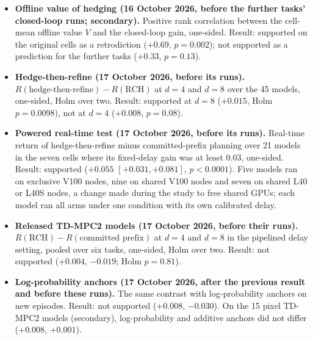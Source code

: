 \begin{itemize}
\item \textbf{Offline value of hedging (16 October 2026, before the further tasks' closed-loop runs; secondary).} Positive rank correlation between the cell-mean offline value $V$ and the closed-loop gain, one-sided. Result: supported on the original cells as a retrodiction ($+0.69$, $p=0.002$); not supported as a prediction for the further tasks ($+0.33$, $p=0.13$).
\item \textbf{Hedge-then-refine (17 October 2026, before its runs).} $R(\text{hedge-then-refine})-R(\text{RCH})$ at $d=4$ and $d=8$ over the 45 models, one-sided, Holm over two. Result: supported at $d=8$ ($+0.015$, Holm $p=0.0098$), not at $d=4$ ($+0.008$, $p=0.08$).
\item \textbf{Powered real-time test (17 October 2026, before its runs).} Real-time return of hedge-then-refine minus committed-prefix planning over 21 models in the seven cells where its fixed-delay gain was at least 0.03, one-sided. Result: supported ($+0.055$ $[+0.031, +0.081]$, $p<0.0001$). Five models ran on exclusive V100 nodes, nine on shared V100 nodes and seven on shared L40 or L40S nodes, a change made during the study to free shared GPUs; each model ran all arms under one condition with its own calibrated delay.
\item \textbf{Released TD-MPC2 models (17 October 2026, before their runs).} $R(\text{RCH})-R(\text{committed prefix})$ at $d=4$ and $d=8$ in the pipelined delay setting, pooled over six tasks, one-sided, Holm over two. Result: not supported ($+0.004$, $-0.019$; Holm $p=0.81$).
\item \textbf{Log-probability anchors (17 October 2026, after the previous result and before these runs).} The same contrast with log-probability anchors on new episodes. Result: not supported ($+0.008$, $-0.030$). On the 15 pixel TD-MPC2 models (secondary), log-probability and additive anchors did not differ ($+0.008$, $+0.001$).
\end{itemize}
